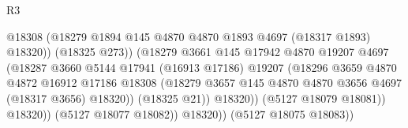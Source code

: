 \begin{lexlean}{R3}
\begin{coremodule}
                                                @18308
                                                (@18279
                                                  @1894
                                                  @145
                                                  @4870
                                                  @4870
                                                  @1893
                                                  @4697
                                                  (@18317 @1893)
                                                  @18320))
                                              (@18325 @273))
                                            (@18279
                                              @3661
                                              @145
                                              @17942
                                              @4870
                                              @19207
                                              @4697
                                              (@18287
                                                @3660
                                                @5144
                                                @17941
                                                (@16913 @17186)
                                                @19207
                                                (@18296
                                                  @3659
                                                  @4870
                                                  @4872
                                                  @16912
                                                  @17186
                                                  @18308
                                                  (@18279
                                                    @3657
                                                    @145
                                                    @4870
                                                    @4870
                                                    @3656
                                                    @4697
                                                    (@18317 @3656)
                                                    @18320))
                                                (@18325 @21))
                                              @18320))
                                          (@5127 @18079 @18081))
                                        @18320))
                                    (@5127 @18077 @18082))
                                  @18320))
                              (@5127 @18075 @18083))

\end{coremodule}
\end{lexlean}
